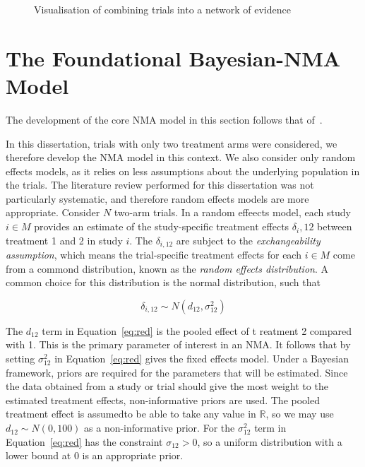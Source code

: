 \begin{figure}[h]
    \centering
    
    \caption{Visualisation of combining trials into a network of evidence}
    \label{fig:comb_evi}
\end{figure}

\section{The Foundational Bayesian-NMA Model}
The development of the core NMA model in this section follows that of~\cite{dias}.

In this dissertation, trials with only two treatment arms were considered, we therefore develop the NMA model in this context. We also consider only random effects models, as it relies on less assumptions about the underlying population in the trials. The literature review performed for this dissertation was not particularly systematic, and therefore random effects models are more appropriate. Consider $N$ two-arm trials. In a random effeects model, each study $i \in M$ provides an estimate of the study-specific treatment effects $\delta_i,12$ between treatment 1 and 2 in study $i$. The $\delta_{i,12}$ are subject to the \textit{exchangeability assumption}, which means the trial-specific treatment effects for each $i \in M$ come from a commond distribution, known as the \textit{random effects distribution}. A common choice for this distribution is the normal distribution, such that 

\begin{equation} \label{eq:red}
    \delta_{i,12} \sim N(d_{12}, \sigma^2_{12})
\end{equation}
 
The $d_{12}$ term in Equation~\ref{eq:red} is the pooled effect of t reatment 2 compared with 1. This is the primary parameter of interest in an NMA. It follows that by setting $\sigma^2_{12}$ in Equation~\ref{eq:red} gives the fixed effects model. Under a Bayesian framework, priors are required for the parameters that will be estimated. Since the data obtained from a study or trial should give the most weight to the estimated treatment effects, non-informative priors are used. The pooled treatment effect is assumedto be able to take any value in $\mathbb{R}$, so we may use $d_{12} \sim N(0,100)$ as a non-informative prior. For the $\sigma^2_{12}$ term in Equation~\ref{eq:red} has the constraint $\sigma_{12} > 0$, so a uniform distribution with a lower bound at $0$ is an appropriate prior. 

